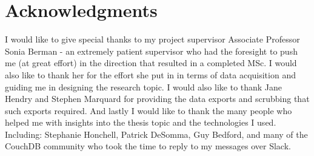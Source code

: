\section*{Acknowledgments}
I would like to give special thanks to my project supervisor Associate Professor Sonia Berman - an extremely patient supervisor who had the foresight to push me (at great effort) in the direction that resulted in a completed MSc. I would also like to thank her for the effort she put in in terms of data acquisition and guiding me in designing the research topic. I would also like to thank Jane Hendry and Stephen Marquard for providing the data exports and scrubbing that such exports required. And lastly I would like to thank the many people who helped me with insights into the thesis topic and the technologies I used. Including: Stephanie Honchell, Patrick DeSomma, Guy Bedford, and many of the CouchDB community who took the time to reply to my messages over Slack.